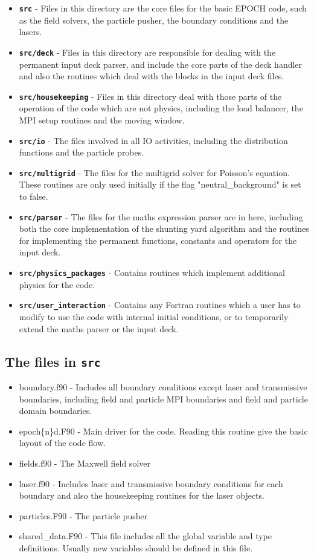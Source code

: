 \documentclass[12pt]{article}
\newcommand{\inlinecode}[1]{{\color{warwickred} \bf\texttt{#1}}}
\newcommand{\nEPOCH}{{\color{warwickdark}\fontfamily{phv}\selectfont EPOCH}}
\newcommand{\EPOCH}{{\nEPOCH} }
\begin{document}
\begin{itemize}
\item \inlinecode{src} - Files in this directory are the core files for the
  basic \EPOCH code, such as the field solvers, the particle pusher, the
  boundary conditions and the lasers.
\item \inlinecode{src/deck} - Files in this directory are responsible for
  dealing with the permanent input deck parser, and include the core parts of
  the deck handler and also the routines which deal with the blocks in the
  input deck files.
\item \inlinecode{src/housekeeping} - Files in this directory deal with those
  parts of the operation of the code which are not physics, including the load
  balancer, the MPI setup routines and the moving window.
\item \inlinecode{src/io} - The files involved in all IO activities, including
  the distribution functions and the particle probes.
\item \inlinecode{src/multigrid} - The files for the multigrid solver for
  Poisson's equation. These routines are only used initially if the flag
  "neutral\_background" is set to false.
\item \inlinecode{src/parser} - The files for the maths expression parser are
  in here, including both the core implementation of the shunting yard
  algorithm and the routines for implementing the permanent functions,
  constants and operators for the input deck.
\item \inlinecode{src/physics\_packages} - Contains routines which implement
  additional physics for the code.
\item \inlinecode{src/user\_interaction} - Contains any Fortran routines which
  a user has to modify to use the code with internal initial conditions, or to
  temporarily extend the maths parser or the input deck.
\end{itemize}

\subsection{The files in \inlinecode{src}}
\begin{itemize}
\item boundary.f90 - Includes all boundary conditions except laser and
  transmissive boundaries, including field and particle MPI boundaries and
  field and particle domain boundaries.
\item epoch\{n\}d.F90 - Main driver for the code. Reading this routine give
  the basic layout of the code flow.
\item fields.f90 - The Maxwell field solver
\item laser.f90 - Includes laser and transmissive boundary conditions for each
  boundary and also the housekeeping routines for the laser objects.
\item particles.F90 - The particle pusher
\item shared\_data.F90 - This file includes all the global variable and type
  definitions. Usually new variables should be defined in this file.
\end{itemize}
\end{document}
